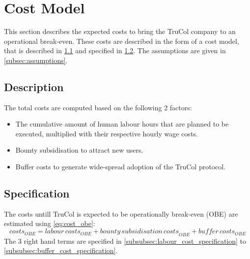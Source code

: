 \section{Cost Model}\label{sec:cost_model}
This section describes the expected costs to bring the TruCol company to an operational break-even. These costs are described in the form of a cost model, that is described in \cref{subsec:model_description} and specified in \cref{subsec:specification}. The assumptions are given in \cref{subsec:assumptions}.

\subsection{Description}\label{subsec:model_description}
The total costs are computed based on the following 2 factors:
\begin{itemize}
	\item The cumulative amount of human labour hours that are planned to be executed, multiplied with their respective hourly wage costs.
	\item Bounty subsidisation to attract new users.
	\item Buffer costs to generate wide-spread adoption of the TruCol protocol.
\end{itemize}


\subsection{Specification}\label{subsec:specification}
The costs untill TruCol is expected to be operationally break-even (OBE) are estimated using \cref{eq:cost_obe}:
\begin{equation}
	costs_{OBE}={labour\, costs}_{OBE}+{bounty\, subsidisation\, costs}_{OBE}+{buffer\, costs}_{OBE}
	\label{eq:cost_obe}
\end{equation}
The 3 right hand terms are specified in \cref{subsubsec:labour_cost_specification} to \cref{subsubsec:buffer_cost_specification}.

